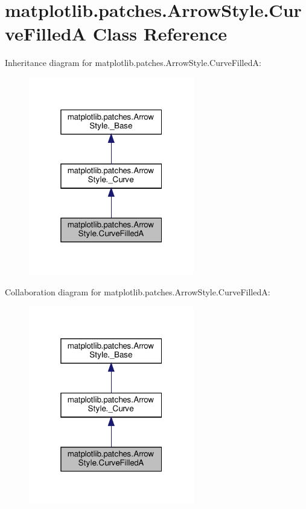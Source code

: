 \hypertarget{classmatplotlib_1_1patches_1_1ArrowStyle_1_1CurveFilledA}{}\section{matplotlib.\+patches.\+Arrow\+Style.\+Curve\+FilledA Class Reference}
\label{classmatplotlib_1_1patches_1_1ArrowStyle_1_1CurveFilledA}


Inheritance diagram for matplotlib.\+patches.\+Arrow\+Style.\+Curve\+FilledA\+:
\nopagebreak
\begin{figure}[H]
\begin{center}
\leavevmode
\includegraphics[width=205pt]{classmatplotlib_1_1patches_1_1ArrowStyle_1_1CurveFilledA__inherit__graph}
\end{center}
\end{figure}


Collaboration diagram for matplotlib.\+patches.\+Arrow\+Style.\+Curve\+FilledA\+:
\nopagebreak
\begin{figure}[H]
\begin{center}
\leavevmode
\includegraphics[width=205pt]{classmatplotlib_1_1patches_1_1ArrowStyle_1_1CurveFilledA__coll__graph}
\end{center}
\end{figure}
